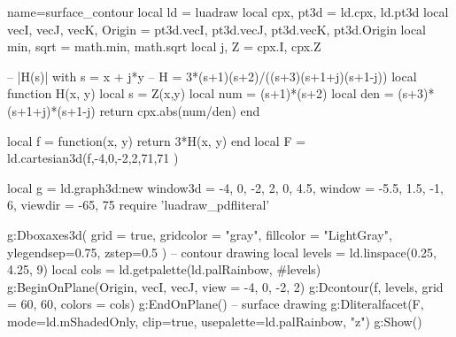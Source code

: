 \documentclass[border=5pt, tikz]{standalone}
\begin{document}
\begin{luadraw}{name=surface_contour}
local ld = luadraw
local cpx, pt3d = ld.cpx, ld.pt3d
local vecI, vecJ, vecK, Origin = pt3d.vecI, pt3d.vecJ, pt3d.vecK, pt3d.Origin
local min, sqrt = math.min, math.sqrt
local j, Z = cpx.I, cpx.Z

-- |H(s)| with s = x + j*y
-- H = 3*(s+1)(s+2)/((s+3)(s+1+j)(s+1-j))
local function H(x, y)
    local s = Z(x,y)
    local num = (s+1)*(s+2)
    local den = (s+3)*(s+1+j)*(s+1-j)
    return cpx.abs(num/den)
end

local f = function(x, y) return 3*H(x, y) end
local F = ld.cartesian3d(f,-4,0,-2,2,{71,71} )

local g = ld.graph3d:new{
    window3d = {-4, 0, -2, 2, 0, 4.5},
    window = {-5.5, 1.5, -1, 6}, 
    viewdir = {-65, 75}
}
require 'luadraw_pdfliteral'

g:Dboxaxes3d( {grid = true, gridcolor = "gray", fillcolor = "LightGray", ylegendsep=0.75, zstep=0.5} )
-- contour drawing
local levels = ld.linspace(0.25, 4.25, 9)
local cols = ld.getpalette(ld.palRainbow, #levels)
g:BeginOnPlane({Origin, vecI, vecJ}, {view = {-4, 0, -2, 2}})
    g:Dcontour(f, levels, {grid = {60, 60}, colors = cols})
g:EndOnPlane()
-- surface drawing
g:Dliteralfacet(F, {mode=ld.mShadedOnly, clip=true, usepalette={ld.palRainbow, "z"}})
g:Show()
\end{luadraw}
\end{document}
